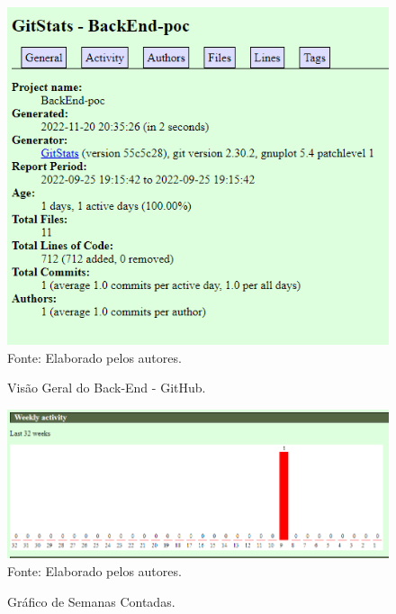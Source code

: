 \documentclass[
    12pt,               %
    openright,          %
    oneside,
    a4paper,            %
    BIBLATEX,           %
    TODO,               %
    english,            %
    brazil              %
    ]{ifsp-spo-inf-ctds}
\begin{document}
    \begin{figure}[H]
                \centering
                \caption{Visão Geral do Back-End - GitHub.}
                \includegraphics[width=1 \textwidth]{Gitstats/back-end/GeralBack.png}
                {\footnotesize Fonte: Elaborado pelos autores.}
                \label{fig:geralBack}
            \end{figure}
    
    
    \begin{figure}[H]
                \centering
                \caption{Gráfico de Semanas Contadas.}
                \includegraphics[width=1 \textwidth]{Gitstats/back-end/SemanasBack.png}
                {\footnotesize Fonte: Elaborado pelos autores.}
                \label{fig:semanasBack}
            \end{figure}
            
\end{document}
